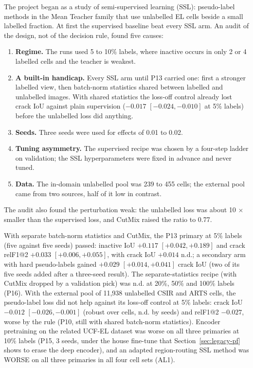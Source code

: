 The project began as a study of semi-supervised learning (SSL): pseudo-label methods in the Mean Teacher family
\citep{tarvainen2017meanteacher} that use unlabelled EL cells beside a small labelled fraction. At first the supervised
baseline beat every SSL arm. An audit of the design, not of the decision rule, found five causes:
\begin{enumerate}
  \item \textbf{Regime.} The runs used 5 to 10\% labels, where inactive occurs in only 2 or 4 labelled cells and the teacher is weakest.
  \item \textbf{A built-in handicap.} Every SSL arm until P13 carried one: first a stronger labelled view, then batch-norm statistics
    shared between labelled and unlabelled images. With shared statistics the loss-off control already lost crack IoU against plain
    supervision ($-0.017$ $[-0.024, -0.010]$ at 5\% labels) before the
    unlabelled loss did anything.
  \item \textbf{Seeds.} Three seeds were used for effects of 0.01 to 0.02.
  \item \textbf{Tuning asymmetry.} The supervised recipe was chosen by a four-step ladder on validation; the SSL hyperparameters were
    fixed in advance and never tuned.
  \item \textbf{Data.} The in-domain unlabelled pool was 239 to 455 cells; the external pool came from two sources, half of it low in contrast.
\end{enumerate}
The audit also found the perturbation weak: the unlabelled loss was about 10 $\times$ smaller than the supervised loss, and CutMix
\citep{yun2019cutmix} raised the ratio to 0.77.

With separate batch-norm statistics and CutMix, the P13 primary at 5\% labels (five against five seeds) passed: inactive IoU
$+0.117$ $[+0.042, +0.189]$ and crack relF1@2 $+0.033$ $[+0.006, +0.055]$, with crack IoU $+0.014$ n.d.; a secondary arm with hard
pseudo-labels gained $+0.029$ $[+0.014, +0.041]$ crack IoU (two of its five seeds added after a three-seed result). The
separate-statistics recipe (with CutMix dropped by a validation pick) was n.d. at 20\%, 50\% and 100\% labels (P16). With the
external pool of 11,938 unlabelled CSIR and ARTS cells, the pseudo-label loss did not help against its loss-off control at 5\%
labels: crack IoU $-0.012$ $[-0.026, -0.001]$ (robust over cells, n.d. by seeds) and relF1@2 $-0.027$, worse by the rule (P10, still
with shared batch-norm statistics). Encoder pretraining on the related UCF-EL dataset was worse on all three primaries at 10\% labels (P15, 3 seeds, under the
house fine-tune that Section~\ref{sec:legacy-pf} shows to erase the deep encoder), and an
adapted region-routing SSL method \citep{lei2025alhvr} was WORSE on all three primaries in all four cell sets (AL1).

